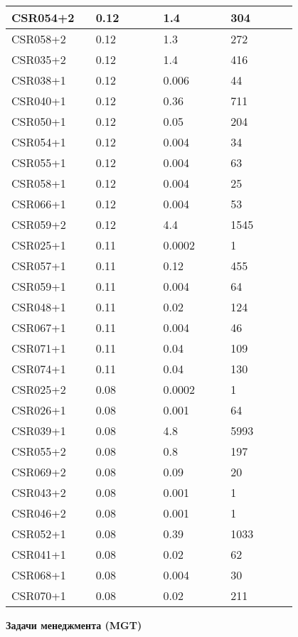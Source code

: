 \begin{longtable}[H]{|p{0.2\linewidth}|p{0.2\linewidth}|p{0.2\linewidth}|p{0.2\linewidth}|}
\hline
CSR054+2 &  0.12 &  1.4 &  304 \\
\hline
CSR058+2 &  0.12 &  1.3 &  272 \\
\hline
CSR035+2 &  0.12 &  1.4 &  416 \\
\hline
CSR038+1 &  0.12 &  0.006 &  44 \\
\hline
CSR040+1 &  0.12 &  0.36 &  711 \\
\hline
CSR050+1 &  0.12 &  0.05 &  204 \\
\hline
CSR054+1 &  0.12 &  0.004 &  34 \\
\hline
CSR055+1 &  0.12 &  0.004 &  63 \\
\hline
CSR058+1 &  0.12 &  0.004 &  25 \\
\hline
CSR066+1 &  0.12 &  0.004 &  53 \\
\hline
CSR059+2 &  0.12 &  4.4 &  1545 \\
\hline
CSR025+1 &  0.11 &  0.0002 &  1 \\
\hline
CSR057+1 &  0.11 &  0.12 &  455 \\
\hline
CSR059+1 &  0.11 &  0.004 &  64 \\
\hline
CSR048+1 &  0.11 &  0.02 &  124 \\
\hline
CSR067+1 &  0.11 &  0.004 &  46 \\
\hline
CSR071+1 &  0.11 &  0.04 &  109 \\
\hline
CSR074+1 &  0.11 &  0.04 &  130 \\
\hline
CSR025+2 &  0.08 &  0.0002 &  1 \\
\hline
CSR026+1 &  0.08 &  0.001 &  64 \\
\hline
CSR039+1 &  0.08 &  4.8 &  5993 \\
\hline
CSR055+2 &  0.08 &  0.8 &  197 \\
\hline
CSR069+2 &  0.08 &  0.09 &  20 \\
\hline
CSR043+2 &  0.08  &  0.001 &  1 \\
\hline
CSR046+2 &  0.08 &  0.001 &  1 \\
\hline
CSR052+1 &  0.08 &  0.39 &  1033 \\
\hline
CSR041+1 &  0.08 &  0.02 &  62 \\
\hline
CSR068+1 &  0.08 &  0.004 &  30 \\
\hline
CSR070+1 &  0.08 &  0.02 &  211 \\
\hline
\end{longtable}


\textbf{Задачи менеджмента (MGT)}

